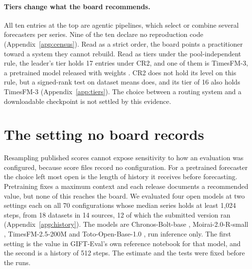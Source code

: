 \documentclass{article}
\begin{document}
\paragraph{Tiers change what the board recommends.} All ten entries at the top are agentic
pipelines, which select or combine several forecasters per series. Nine of the ten declare no reproduction code
(Appendix~\ref{app:census}). Read as a strict order, the board points a practitioner toward a
system they cannot rebuild. Read as tiers under the pool-independent rule, the leader's tier
holds 17 entries under CR2, and one of them is TimesFM-3, a pretrained model released with
weights \citep{timesfm}. CR2 does not hold its level on this rule, but a signed-rank test on
dataset means does, and its tier of 16 also holds TimesFM-3 (Appendix~\ref{app:tiers}). The
choice between a
routing system and a downloadable checkpoint is not settled by this evidence.

\section{The setting no board records}
\label{sec:protocol}

Resampling published scores cannot expose sensitivity to how an evaluation was configured,
because score files record no configuration. For a pretrained forecaster the choice left
most open is the length of history it receives before forecasting. Pretraining fixes a
maximum context and each release documents a recommended value, but none of this reaches the
board. We evaluated four open models at
two settings each on all 70 configurations whose median series holds at least 1,024 steps,
from 18 datasets in 14 sources, 12 of which the submitted version ran
(Appendix~\ref{app:history}). The models are
Chronos-Bolt-base \citep{chronos}, Moirai-2.0-R-small \citep{moirai}, TimesFM-2.5-200M
\citep{timesfm} and Toto-Open-Base-1.0 \citep{toto}, run inference only. The first setting is
the value in GIFT-Eval's own reference notebook for that model, and the second is a history of
512 steps. The estimate and the tests were fixed before the runs.
\end{document}
